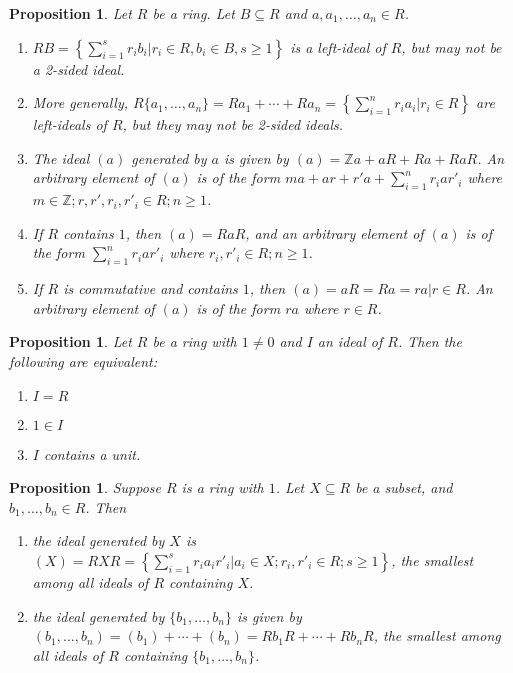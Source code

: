 \documentclass[a4paper,8pt]{article}
\theoremstyle{theorem}
\newtheorem{proposition}[theorem]{Proposition}
\begin{document}
\begin{proposition}
Let $R$ be a ring. Let $B\subseteq R$ and $a, a_1, \ldots, a_n \in R$.
\begin{enumerate}[label=(\roman*)]
\item $RB = \left\{\sum_{i=1}^{s} r_i b_i | r_i \in R, b_i \in B, s \geq 1 \right\}$ is a left-ideal of $R$, but may not be a 2-sided ideal.
\item More generally, $R\{a_1, \ldots, a_n\} = Ra_1 + \cdots + Ra_n = \left\{\sum_{i=1}^{n} r_i a_i | r_i \in R \right\}$ are left-ideals of $R$, but they may not be 2-sided ideals.
\item The ideal $(a)$ generated by $a$ is given by $(a)=\mathbb{Z}a + aR + Ra + RaR$. An arbitrary element of $(a)$ is of the form $ma + ar + r'a + \sum_{i=1}^{n} r_i a r'_i$ where $m\in \mathbb{Z}; r, r', r_i, r'_i \in R; n \geq 1$.
\item If $R$ contains $1$, then $(a)=RaR$, and an arbitrary element of $(a)$ is of the form $\sum_{i=1}^{n} r_i a r'_i$  where $r_i, r'_i \in R; n \geq 1$.
\item If $R$ is commutative and contains $1$, then $(a)=aR=Ra={ra|r\in R}$. An arbitrary element of $(a)$ is of the form $ra$ where $r \in R$.
\end{enumerate}
\end{proposition}


\begin{proposition}
Let $R$ be a ring with $1 \neq 0$ and $I$ an ideal of $R$. Then the following are equivalent:
\begin{enumerate}[label=(\roman*)]
\item $I = R$
\item $1 \in I$
\item $I$ contains a unit.	
\end{enumerate}
\end{proposition}


\begin{proposition}
Suppose $R$ is a ring with $1$. Let $X \subseteq R$ be a subset, and $b_1, \ldots, b_n \in R$. Then
\begin{enumerate}[label=(\roman*)]
\item the ideal generated by $X$ is $(X)=RXR=\left\{ \sum_{i=1}^{s} r_i a_i r'_i | a_i \in X; r_i, r'_i \in R; s \geq 1\right\}$, the smallest among all ideals of $R$ containing $X$.
\item the ideal generated by $\{b_1, \ldots, b_n\}$ is given by $(b_1, \ldots, b_n) = (b_1) + \cdots + (b_n) = Rb_1R + \cdots + Rb_nR$, the smallest among all ideals of $R$ containing $\{b_1, \ldots, b_n\}$.
\end{enumerate}
\end{proposition}
\end{document}
